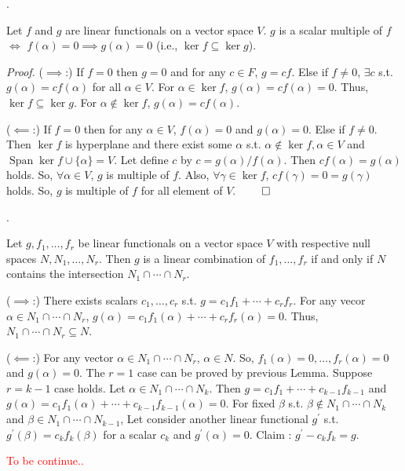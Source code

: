 \documentclass[8pt]{beamer}
\newcommand{\ti}[1]{\textit{#1}}
\newcommand{\Span}{\operatorname{Span}}
\begin{document}
\begin{frame}{.}
    \begin{lemma}
        Let $f$ and $g$ are linear functionals on a vector space $V$.
        $g$ is a scalar multiple of $f$ $\iff$ $f(\alpha) = 0 \implies g(\alpha) = 0$ (i.e., $\ker f \subseteq \ker g$).
    \end{lemma}
    \ti{Proof.}
    ($\implies$:) If $f = 0$ then $g = 0$ and for any $c \in F$, $g = c f$.
    Else if $f \neq 0$, $\exists c$ s.t. $g(\alpha) = c f(\alpha)$ for all $\alpha \in V$.
    For $\alpha \in \ker f$, $g(\alpha) = c f(\alpha) = 0$.
    Thus, $\ker f  \subseteq \ker g$.
    For $\alpha \notin \ker f$, $g(\alpha) = cf(\alpha)$.

    ($\impliedby$:)
    If $f = 0$ then for any $\alpha \in V$, $f(\alpha) = 0$ and $g(\alpha) = 0$.
    Else if $f \neq 0$. Then $\ker f$ is hyperplane and there exist some $\alpha$ s.t. $\alpha \notin \ker f, \alpha \in V$ and $\Span \ker f \cup \{\alpha\} = V$.
    Let define $c$ by $c = g(\alpha)/ f(\alpha)$.
    Then $cf(\alpha) = g(\alpha)$ holds.
    So, $\forall \alpha \in V$, $g$ is multiple of $f$.
    Also, $\forall \gamma \in \ker f$, $c f(\gamma) = 0 = g(\gamma)$ holds.
    So, $g$ is multiple of $f$ for all element of $V$.
    $\qed$
\end{frame}

\begin{frame}{.}
    \begin{theorem}
        Let $g, f_1, \dots, f_r$ be linear functionals on a vector space $V$ with respective null spaces $N, N_1, \dots, N_r$.
        Then $g$ is a linear combination of $f_1, \dots, f_r$ if and only if $N$ contains the intersection $N_1 \cap \cdots \cap N_r$.
    \end{theorem}
    ($\implies$:) There exists scalars $c_1, \dots, c_r$ s.t. $g = c_1 f_1 + \cdots + c_r f_r$.
    For any vecor $\alpha \in N_1 \cap \cdots \cap N_r$, $g(\alpha) = c_1f_1(\alpha)+ \cdots + c_r f_r(\alpha) = 0$.
    Thus, $N_1 \cap \cdots \cap N_r \subseteq N$.

    ($\impliedby$:) For any vector $\alpha \in N_1 \cap \cdots \cap N_r$, $\alpha \in N$.
    So, $f_1(\alpha) = 0, \dots, f_r(\alpha)=0$ and $g(\alpha) = 0$.
    The $r=1$ case can be proved by previous Lemma.
    Suppose $r=k-1$ case holds.
    Let $\alpha \in N_1 \cap \cdots \cap N_{k}$.
    Then $g = c_1 f_1 + \cdots + c_{k-1} f_{k-1}$ and $g(\alpha) = c_1 f_1(\alpha) + \cdots + c_{k-1} f_{k-1}(\alpha) = 0$.
    For fixed $\beta$ s.t.  $\beta \notin N_1 \cap \cdots \cap N_k$ and $\beta \in N_1 \cap \cdots \cap N_{k-1}$, Let consider another linear functional $g^\prime$ s.t. $g^\prime(\beta) = c_k f_k(\beta)$ for a scalar $c_k$ and $g^\prime(\alpha) = 0$.
    Claim : $g^\prime - c_k f_k = g$.

    \textcolor{red}{To be continue..}
\end{frame}
\end{document}
